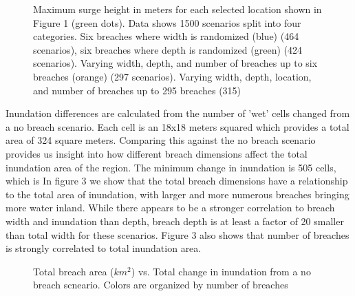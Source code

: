 \documentclass{coastal_paper}
\begin{document}
\begin{figure}[ht]
\centering
\resizebox{\textwidth}{!}{%
        
    }
\caption{Maximum surge height in meters for each selected location shown in Figure 1 (green dots). Data shows 1500 scenarios split into four categories. Six breaches where width is randomized (blue) (464 scenarios), six breaches where depth is randomized (green) (424 scenarios). Varying width, depth, and number of breaches up to six breaches (orange) (297 scenarios). Varying width, depth, location, and number of breaches up to 295 breaches (315)}
\label{fig2}
\end{figure}

Inundation differences are calculated from the number of 'wet' cells changed from a no breach scenario. Each cell is an 18x18 meters squared which provides a total area of 324 square meters. Comparing this against the no breach scenario provides us insight into how different breach dimensions affect the total inundation area of the region. The minimum change in inundation is 505 cells, which is %
In figure 3 we show that the total breach dimensions have a relationship to the total area of inundation, with larger and more numerous breaches bringing more water inland. While there appears to be a stronger correlation to breach width and inundation than depth, breach depth is at least a factor of 20 smaller than total width for these scenarios.
Figure 3 also shows that number of breaches is strongly correlated to total inundation area. 
\begin{figure}[ht]
    \centering
\label{fig3}
\caption{Total breach area ($km^2$) vs. Total change in inundation from a no breach scneario. Colors are organized by number of breaches}
\end{figure}
\end{document}
